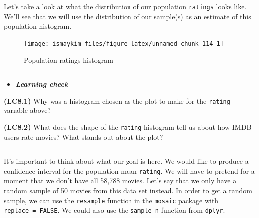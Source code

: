 \documentclass[]{tufte-book}
\newenvironment{Shaded}{\begin{snugshade}}{\end{snugshade}}
\newcommand{\KeywordTok}[1]{\textcolor[rgb]{0.13,0.29,0.53}{\textbf{{#1}}}}
\newcommand{\DataTypeTok}[1]{\textcolor[rgb]{0.13,0.29,0.53}{{#1}}}
\newcommand{\DecValTok}[1]{\textcolor[rgb]{0.00,0.00,0.81}{{#1}}}
\newcommand{\StringTok}[1]{\textcolor[rgb]{0.31,0.60,0.02}{{#1}}}
\newcommand{\NormalTok}[1]{{#1}}
\let\oldrule=\rule
\renewcommand{\rule}[1]{\oldrule{\linewidth}}
\newenvironment{rmdblock}[1]
  {\begin{shaded*}
  \begin{itemize}
  \renewcommand{\labelitemi}{
    \raisebox{-.7\height}[0pt][0pt]{
    }
  }
  \item
  }
  {
  \end{itemize}
  \end{shaded*}
  }
\newenvironment{learncheck}
  {\begin{rmdblock}{warning}}
  {\end{rmdblock}}
\theoremstyle{definition}
\theoremstyle{definition}
\theoremstyle{remark}
\begin{document}
Let's take a look at what the distribution of our population
\texttt{ratings} looks like. We'll see that we will use the distribution
of our sample(s) as an estimate of this population histogram.

\begin{Shaded}
\end{Shaded}

\begin{figure}

{\centering \texttt{[image: ismaykim\_files/figure-latex/unnamed-chunk-114-1]} 

}

\caption[Population ratings histogram]{Population ratings histogram}\label{fig:unnamed-chunk-114}
\end{figure}

\begin{center}\rule{0.5\linewidth}{\linethickness}\end{center}

\begin{learncheck}
\textbf{\emph{Learning check}}
\end{learncheck}

\textbf{(LC8.1)} Why was a histogram chosen as the plot to make for the
\texttt{rating} variable above?

\textbf{(LC8.2)} What does the shape of the \texttt{rating} histogram
tell us about how IMDB users rate movies? What stands out about the
plot?

\begin{center}\rule{0.5\linewidth}{\linethickness}\end{center}

It's important to think about what our goal is here. We would like to
produce a confidence interval for the population mean \texttt{rating}.
We will have to pretend for a moment that we don't have all 58,788
movies. Let's say that we only have a random sample of 50 movies from
this data set instead. In order to get a random sample, we can use the
\texttt{resample} function in the \texttt{mosaic} package with
\texttt{replace\ =\ FALSE}. We could also use the \texttt{sample\_n}
function from \texttt{dplyr}.
\end{document}
